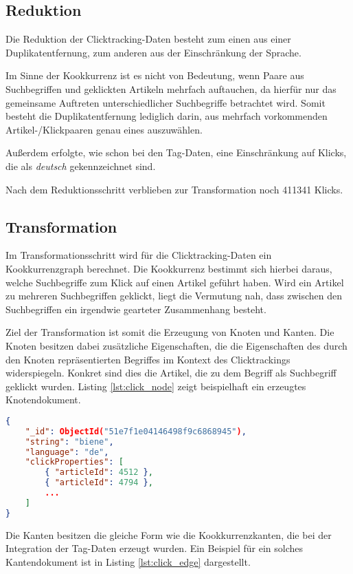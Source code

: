\subsection{Reduktion}

Die Reduktion der Clicktracking-Daten besteht zum einen aus einer Duplikatentfernung, zum anderen aus der Einschränkung der Sprache.

Im Sinne der Kookkurrenz ist es nicht von Bedeutung, wenn Paare aus Suchbegriffen und geklickten Artikeln mehrfach auftauchen, da hierfür nur das gemeinsame Auftreten unterschiedlicher Suchbegriffe betrachtet wird. Somit besteht die Duplikatentfernung lediglich darin, aus mehrfach vorkommenden Artikel-/Klickpaaren genau eines auszuwählen.

Außerdem erfolgte, wie schon bei den Tag-Daten, eine Einschränkung auf Klicks, die als \emph{deutsch} gekennzeichnet sind.

Nach dem Reduktionsschritt verblieben zur Transformation noch \num{411341} Klicks.

\subsection{Transformation}

Im Transformationsschritt wird für die Clicktracking-Daten ein Kookkurrenzgraph berechnet. Die Kookkurrenz bestimmt sich hierbei daraus, welche Suchbegriffe zum Klick auf einen Artikel geführt haben. Wird ein Artikel zu mehreren Suchbegriffen geklickt, liegt die Vermutung nah, dass zwischen den Suchbegriffen ein irgendwie gearteter Zusammenhang besteht.

Ziel der Transformation ist somit die Erzeugung von Knoten und Kanten. Die Knoten besitzen dabei zusätzliche Eigenschaften, die die Eigenschaften des durch den Knoten repräsentierten Begriffes im Kontext des Clicktrackings widerspiegeln. Konkret sind dies die Artikel, die zu dem Begriff als Suchbegriff geklickt wurden. Listing \ref{lst:click_node} zeigt beispielhaft ein erzeugtes Knotendokument.

\begin{lstlisting}[language=json, label={lst:click_node}, caption={Knotendokument mit Clicktracking-Eigenschaften}]
{
    "_id": ObjectId("51e7f1e04146498f9c6868945"),
    "string": "biene",
    "language": "de",
    "clickProperties": [
        { "articleId": 4512 },
        { "articleId": 4794 },
        ...
    ]
}
\end{lstlisting}

Die Kanten besitzen die gleiche Form wie die Kookkurrenzkanten, die bei der Integration der Tag-Daten erzeugt wurden. Ein Beispiel für ein solches Kantendokument ist in Listing \ref{lst:click_edge} dargestellt.


